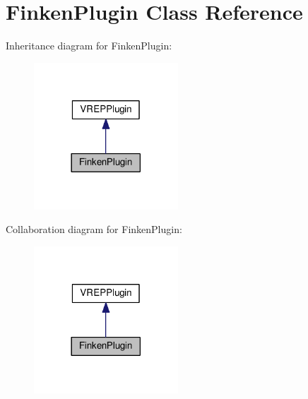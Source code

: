 \hypertarget{classFinkenPlugin}{}\section{Finken\+Plugin Class Reference}
\label{classFinkenPlugin}


Inheritance diagram for Finken\+Plugin\+:\nopagebreak
\begin{figure}[H]
\begin{center}
\leavevmode
\includegraphics[width=153pt]{classFinkenPlugin__inherit__graph}
\end{center}
\end{figure}


Collaboration diagram for Finken\+Plugin\+:\nopagebreak
\begin{figure}[H]
\begin{center}
\leavevmode
\includegraphics[width=153pt]{classFinkenPlugin__coll__graph}
\end{center}
\end{figure}
